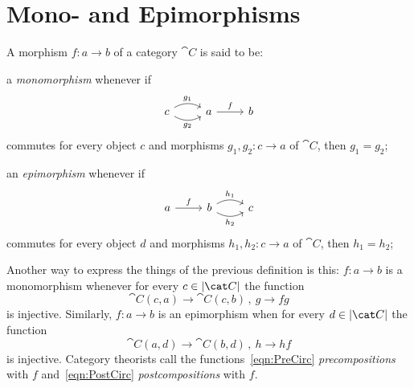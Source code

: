 
\section{Mono- and Epimorphisms}


\begin{definition}
A morphism \(f : a \to b\) of a category \(\cat C\) is said to be:
\begin{tcbitem}
\item a {\em monomorphism} whenever if
\[\begin{tikzcd}
c \ar["{g_1}", r, bend left] \ar["{g_2}", r, bend right, swap] & a \ar["f", r] & b
\end{tikzcd}\]
commutes for every object \(c\) and morphisms \(g_1, g_2 : c \to a\) of \(\cat C\), then \(g_1 = g_2\);
\item an {\em epimorphism} whenever if
\[\begin{tikzcd}
a \ar["f", r] & b \ar["{h_1}", r, bend left] \ar["{h_2}", r, bend right, swap] & c
\end{tikzcd}\]
commutes for every object \(d\) and morphisms \(h_1, h_2 : c \to a\) of \(\cat C\), then \(h_1 = h_2\);
\end{tcbitem}
\end{definition}

\NotaInterna{\dots{}}

Another way to express the things of the previous definition is this:
\(f : a \to b\) is a monomorphism whenever for every \(c \in \obj{\cat C}\) the function
\begin{equation}\cat C (c, a) \to \cat C (c, b)\,, \ g \to fg \label{eqn:PreCirc}\end{equation}
is injective. Similarly, \(f : a \to b\) is an epimorphism when for every \(d \in \obj{\cat C}\) the function
\begin{equation}\cat C (a, d) \to \cat C (b, d)\,, \ h \to hf \label{eqn:PostCirc}\end{equation}
is injective. Category theorists call the functions~\eqref{eqn:PreCirc} {\em precompositions} with \(f\) and~\eqref{eqn:PostCirc} {\em postcompositions} with \(f\).
